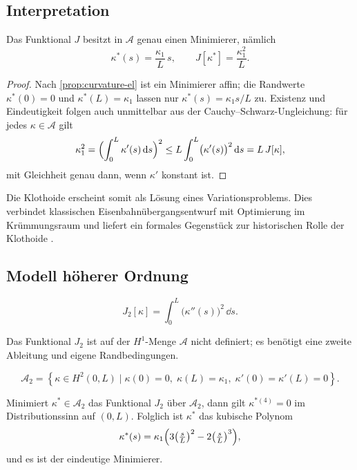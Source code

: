 \subsection{Interpretation}
\begin{proposition}
\label{prop:curvature-el-minimizer}
Das Funktional \(J\) besitzt in \(\mathcal A\) genau einen Minimierer,
nämlich
\[
\kappa^\ast(s)=\frac{\kappa_1}{L}\,s,
\qquad
J[\kappa^\ast]=\frac{\kappa_1^2}{L}.
\]
\end{proposition}

\begin{proof}
Nach \cref{prop:curvature-el} ist ein Minimierer affin; die Randwerte
\(\kappa^\ast(0)=0\) und \(\kappa^\ast(L)=\kappa_1\) lassen nur
\(\kappa^\ast(s)=\kappa_1 s/L\) zu. Existenz und Eindeutigkeit folgen auch
unmittelbar aus der Cauchy--Schwarz-Ungleichung: für jedes
\(\kappa\in\mathcal A\) gilt
\[
\kappa_1^2
=\Bigl(\int_0^L\kappa'(s)\,\mathrm{d} s\Bigr)^2
\le L\int_0^L\bigl(\kappa'(s)\bigr)^2\,\mathrm{d} s
= L\,J[\kappa],
\]
mit Gleichheit genau dann, wenn \(\kappa'\) konstant ist.
\end{proof}

Die Klothoide erscheint somit als Lösung eines Variationsproblems. Dies
verbindet klassischen Eisenbahnübergangsentwurf mit Optimierung im
Krümmungsraum und liefert ein formales Gegenstück zur historischen Rolle der
Klothoide \cite{Glover1900TransitionCurves,Higgins1922TransitionSpiral}.

\subsection{Modell höherer Ordnung}
\begin{definition}
\[
J_2[\kappa]=\int_0^L\bigl(\kappa''(s)\bigr)^2\,\dd s.
\]
\end{definition}
Das Funktional \(J_2\) ist auf der \(H^1\)-Menge \(\mathcal A\) nicht
definiert; es benötigt eine zweite Ableitung und eigene Randbedingungen.

\begin{definition}
\[
\mathcal A_2=
\left\{\kappa\in H^2(0,L)\mid
\kappa(0)=0,\;\kappa(L)=\kappa_1,\;
\kappa'(0)=\kappa'(L)=0\right\}.
\]
\end{definition}

\begin{proposition}
\label{prop:curvature-el-fourth-order}
Minimiert \(\kappa^\ast\in\mathcal A_2\) das Funktional \(J_2\) über
\(\mathcal A_2\), dann gilt \(\kappa^{\ast(4)}=0\) im Distributionssinn auf
\((0,L)\). Folglich ist \(\kappa^\ast\) das kubische Polynom
\[
\kappa^\ast(s)
=\kappa_1\Bigl(3\bigl(\tfrac{s}{L}\bigr)^2-2\bigl(\tfrac{s}{L}\bigr)^3\Bigr),
\]
und es ist der eindeutige Minimierer.
\end{proposition}

